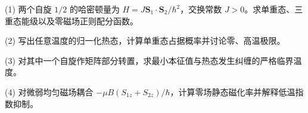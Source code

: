 (1) 两个自旋 \(1/2\) 的哈密顿量为 \(H=J\mathbf S_1\cdot\mathbf S_2/\hbar^2\)，交换常数 \(J>0\)。求单重态、三重态能级以及零磁场正则配分函数。

(2) 写出任意温度的归一化热态，计算单重态占据概率并讨论零、高温极限。

(3) 对其中一个自旋作矩阵部分转置，求最小本征值与热态发生纠缠的严格临界温度。

(4) 对微弱均匀磁场耦合 \(-\mu B(S_{1z}+S_{2z})/\hbar\)，计算零场静态磁化率并解释低温指数抑制。

